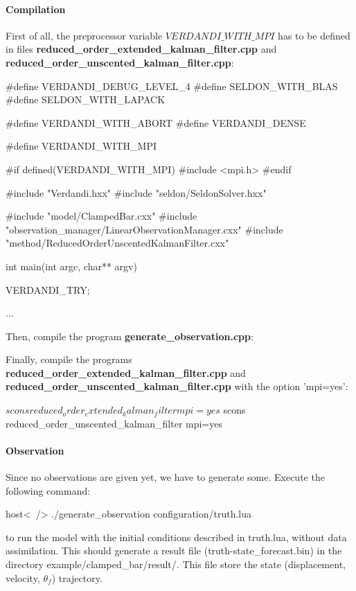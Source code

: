 \documentclass{tufte-book}
\begin{document}
\hypertarget{par-seq-example-compilation}{}\paragraph{Compilation}\label{par-seq-example-compilation}

First of all, the preprocessor variable $ VERDANDI\_WITH\_MPI $ has to be defined in files  \textbf{reduced\_order\_extended\_kalman\_filter.cpp} and \textbf{reduced\_order\_unscented\_kalman\_filter.cpp}:

\begin{frame_cpp}
#define VERDANDI_DEBUG_LEVEL_4
#define SELDON_WITH_BLAS
#define SELDON_WITH_LAPACK

#define VERDANDI_WITH_ABORT
#define VERDANDI_DENSE

#define VERDANDI_WITH_MPI

#if defined(VERDANDI_WITH_MPI)
#include <mpi.h>
#endif


#include "Verdandi.hxx"
#include "seldon/SeldonSolver.hxx"

#include "model/ClampedBar.cxx"
#include "observation_manager/LinearObservationManager.cxx"
#include "method/ReducedOrderUnscentedKalmanFilter.cxx"


int main(int argc, char** argv)
{

    VERDANDI_TRY;

    ...
}
\end{frame_cpp}

Then, compile the program \textbf{generate\_observation.cpp}:



Finally, compile the programs \textbf{reduced\_order\_extended\_kalman\_filter.cpp} and \textbf{reduced\_order\_unscented\_kalman\_filter.cpp}  with the option 'mpi=yes':
\begin{frame_bash}
$ scons reduced_order_extended_kalman_filter mpi=yes
$ scons reduced_order_unscented_kalman_filter mpi=yes
\end{frame_bash}



\hypertarget{par-seq-example-observation}{}\paragraph{Observation}\label{par-seq-example-observation}

\-Since no observations are given yet, we have to generate some. \-Execute the following command\-:
\begin{frame_bash}
host<~/> ./generate_observation configuration/truth.lua
\end{frame_bash}
  to run the model with the initial conditions described in {\ttfamily truth.\-lua}, without data assimilation. \-This should generate a result file ({\ttfamily truth-\/state\-\_\-forecast.\-bin}) in the directory {\ttfamily example/clamped\-\_\-bar/result/}. \-This file store the state (displacement, velocity, $ \theta_{f} $) trajectory.
\end{document}
